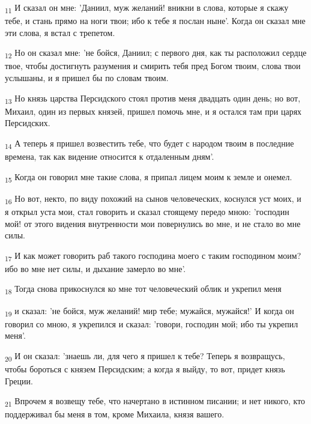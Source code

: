 \begin{tcolorbox}
\textsubscript{11} И сказал он мне: 'Даниил, муж желаний! вникни в слова, которые я скажу тебе, и стань прямо на ноги твои; ибо к тебе я послан ныне'. Когда он сказал мне эти слова, я встал с трепетом.
\end{tcolorbox}
\begin{tcolorbox}
\textsubscript{12} Но он сказал мне: 'не бойся, Даниил; с первого дня, как ты расположил сердце твое, чтобы достигнуть разумения и смирить тебя пред Богом твоим, слова твои услышаны, и я пришел бы по словам твоим.
\end{tcolorbox}
\begin{tcolorbox}
\textsubscript{13} Но князь царства Персидского стоял против меня двадцать один день; но вот, Михаил, один из первых князей, пришел помочь мне, и я остался там при царях Персидских.
\end{tcolorbox}
\begin{tcolorbox}
\textsubscript{14} А теперь я пришел возвестить тебе, что будет с народом твоим в последние времена, так как видение относится к отдаленным дням'.
\end{tcolorbox}
\begin{tcolorbox}
\textsubscript{15} Когда он говорил мне такие слова, я припал лицем моим к земле и онемел.
\end{tcolorbox}
\begin{tcolorbox}
\textsubscript{16} Но вот, некто, по виду похожий на сынов человеческих, коснулся уст моих, и я открыл уста мои, стал говорить и сказал стоящему передо мною: 'господин мой! от этого видения внутренности мои повернулись во мне, и не стало во мне силы.
\end{tcolorbox}
\begin{tcolorbox}
\textsubscript{17} И как может говорить раб такого господина моего с таким господином моим? ибо во мне нет силы, и дыхание замерло во мне'.
\end{tcolorbox}
\begin{tcolorbox}
\textsubscript{18} Тогда снова прикоснулся ко мне тот человеческий облик и укрепил меня
\end{tcolorbox}
\begin{tcolorbox}
\textsubscript{19} и сказал: 'не бойся, муж желаний! мир тебе; мужайся, мужайся!' И когда он говорил со мною, я укрепился и сказал: 'говори, господин мой; ибо ты укрепил меня'.
\end{tcolorbox}
\begin{tcolorbox}
\textsubscript{20} И он сказал: 'знаешь ли, для чего я пришел к тебе? Теперь я возвращусь, чтобы бороться с князем Персидским; а когда я выйду, то вот, придет князь Греции.
\end{tcolorbox}
\begin{tcolorbox}
\textsubscript{21} Впрочем я возвещу тебе, что начертано в истинном писании; и нет никого, кто поддерживал бы меня в том, кроме Михаила, князя вашего.
\end{tcolorbox}
